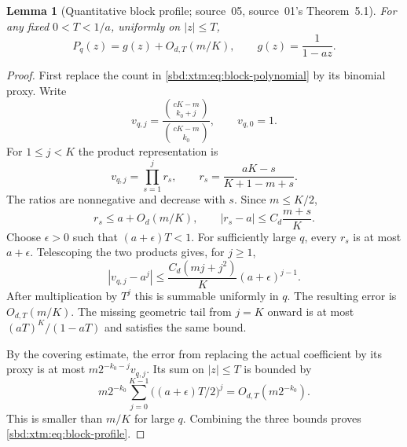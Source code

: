 \documentclass[11pt,a4paper]{article}
\newtheorem{lemma}[theorem]{Lemma}
\theoremstyle{definition}
\begin{document}
\begin{lemma}[Quantitative block profile; source~05, source~01's Theorem~5.1]\label{sbd:xtm:lem:block-profile}
For any fixed $0<T<1/a$, uniformly on $|z|\le T$,
\begin{equation}\label{sbd:xtm:eq:block-profile}
 P_q(z)=g(z)+O_{d,T}(m/K),\qquad g(z)=\frac1{1-az}.
\end{equation}
\end{lemma}
\begin{proof}
First replace the count in \eqref{sbd:xtm:eq:block-polynomial} by its binomial
proxy. Write
\[
 v_{q,j}=\frac{\binom{cK-m}{k_0+j}}{\binom{cK-m}{k_0}},
 \qquad v_{q,0}=1.
\]
For $1\le j<K$ the product representation is
\begin{equation}\label{sbd:xtm:eq:consecutive-ratios}
 v_{q,j}=\prod_{s=1}^jr_s,\qquad
 r_s=\frac{aK-s}{K+1-m+s}.
\end{equation}
The ratios are nonnegative and decrease with $s$. Since $m\le K/2$,
\begin{equation}\label{sbd:xtm:eq:ratio-bounds}
 r_s\le a+O_d(m/K),\qquad
 |r_s-a|\le C_d\frac{m+s}{K}.
\end{equation}
Choose $\epsilon>0$ such that $(a+\epsilon)T<1$. For sufficiently
large $q$, every $r_s$ is at most $a+\epsilon$. Telescoping the two
products gives, for $j\ge1$,
\begin{equation}\label{sbd:xtm:eq:product-difference}
 |v_{q,j}-a^j|
 \le\frac{C_d(mj+j^2)}{K}(a+\epsilon)^{j-1}.
\end{equation}
After multiplication by $T^j$ this is summable uniformly in $q$.
The resulting error is $O_{d,T}(m/K)$. The missing geometric tail
from $j=K$ onward is at most $(aT)^K/(1-aT)$ and satisfies the same bound.

By the covering estimate, the error from replacing the actual
coefficient by its proxy is at most $m2^{-k_0-j}v_{q,j}$. Its sum on
$|z|\le T$ is bounded by
\[
 m2^{-k_0}\sum_{j=0}^{K-1}
   \bigl((a+\epsilon)T/2\bigr)^j
 =O_{d,T}(m2^{-k_0}).
\]
This is smaller than $m/K$ for large $q$. Combining the three
bounds proves \eqref{sbd:xtm:eq:block-profile}.
\end{proof}
\end{document}
